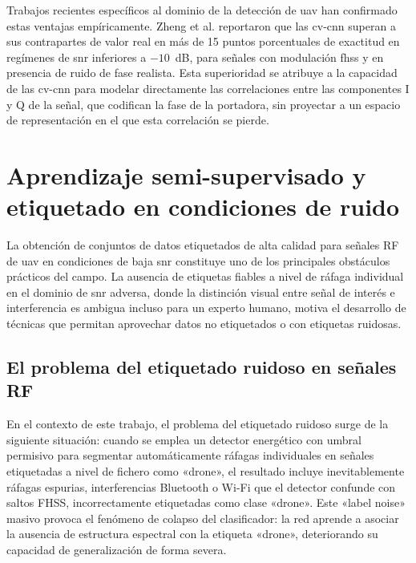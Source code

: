 Trabajos recientes específicos al dominio de la detección de \gls{uav} han confirmado
estas ventajas empíricamente. Zheng et al. \cite{zheng_uavsignal_2025} reportaron
que las \gls{cv-cnn} superan a sus contrapartes de valor real en más de 15 puntos
porcentuales de exactitud en regímenes de \gls{snr} inferiores a $-10$\, dB, para
señales con modulación \gls{fhss} y en presencia de ruido de fase realista. Esta
superioridad se atribuye a la capacidad de las \gls{cv-cnn} para modelar directamente
las correlaciones entre las componentes I y Q de la señal, que codifican la fase
de la portadora, sin proyectar a un espacio de representación en el que esta
correlación se pierde.

\section{Aprendizaje semi-supervisado y etiquetado en condiciones de ruido}
\label{sec:semisupervisado}

La obtención de conjuntos de datos etiquetados de alta calidad para señales RF de
\gls{uav} en condiciones de baja \gls{snr} constituye uno de los principales
obstáculos prácticos del campo. La ausencia de etiquetas fiables a nivel de ráfaga
individual en el dominio de \gls{snr} adversa, donde la distinción visual entre señal
de interés e interferencia es ambigua incluso para un experto humano, motiva el
desarrollo de técnicas que permitan aprovechar datos no etiquetados o con etiquetas
ruidosas.

\subsection{El problema del etiquetado ruidoso en señales RF}
\label{subsec:label_noise}

En el contexto de este trabajo, el problema del etiquetado ruidoso surge de la
siguiente situación: cuando se emplea un detector energético con umbral permisivo
para segmentar automáticamente ráfagas individuales en señales etiquetadas a nivel
de fichero como «drone», el resultado incluye inevitablemente ráfagas espurias,
interferencias Bluetooth o Wi-Fi que el detector confunde con saltos FHSS,
incorrectamente etiquetadas como clase «drone». Este «label noise» masivo provoca
el fenómeno de colapso del clasificador: la red aprende a asociar la ausencia de
estructura espectral con la etiqueta «drone», deteriorando su capacidad de
generalización de forma severa.

